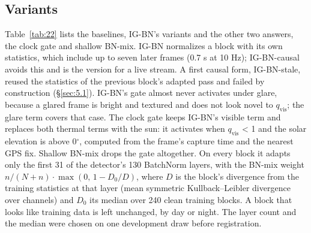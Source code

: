 \documentclass[10pt]{article}
\begin{document}
\subsection{Variants}\label{sec:4.4}
Table~\ref{tab:22} lists the baselines, IG-BN's variants and the other two answers, the clock gate and shallow BN-mix. IG-BN normalizes a block with its own statistics, which include up to seven later frames (0.7 s at 10 Hz); IG-BN-causal avoids this and is the version for a live stream. A first causal form, IG-BN-stale, reused the statistics of the previous block's adapted pass and failed by construction (\S\ref{sec:5.1}). IG-BN's gate almost never activates under glare, because a glared frame is bright and textured and does not look novel to $q_{\mathrm{vis}}$; the glare term covers that case. The clock gate keeps IG-BN's visible term and replaces both thermal terms with the sun: it activates when $q_{\mathrm{vis}}$ < 1 and the solar elevation is above 0$^{\circ}$, computed from the frame's capture time and the nearest GPS fix. Shallow BN-mix drops the gate altogether. On every block it adapts only the first 31 of the detector's 130 BatchNorm layers, with the BN-mix weight $n/(N+n)\cdot\max(0,\,1 - D_0/D)$, where $D$ is the block's divergence from the training statistics at that layer (mean symmetric Kullback--Leibler divergence over channels) and $D_0$ its median over 240 clean training blocks. A block that looks like training data is left unchanged, by day or night. The layer count and the median were chosen on one development draw before registration.
\end{document}
